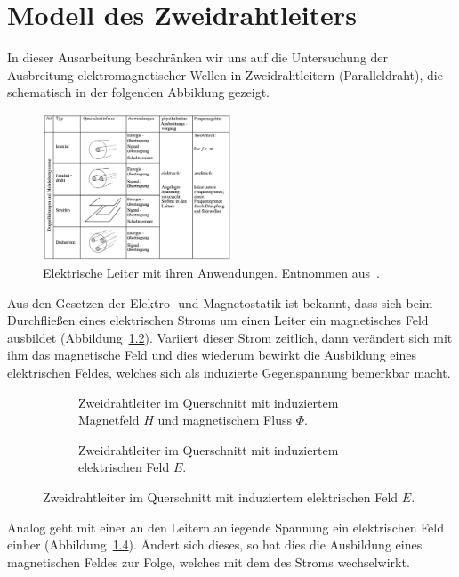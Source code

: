 \documentclass[paper=a4, parskip=half-, ngerman, fontsize=11pt]{scrreprt}
\begin{document}
\chapter{Modell des Zweidrahtleiters}

In dieser Ausarbeitung beschränken wir uns auf die Untersuchung der Ausbreitung elektromagnetischer Wellen in
Zweidrahtleitern (Paralleldraht), die schematisch in der folgenden Abbildung gezeigt.
\begin{figure}[!ht]
    \begin{center}
        \includegraphics[width=0.5\textwidth]{images/Leiter.png}
        \caption{Elektrische Leiter mit ihren Anwendungen. Entnommen aus~\cite{FernuniSkript}.}
        \label{Leiter}
    \end{center}
\end{figure}

Aus den Gesetzen der Elektro- und Magnetostatik ist bekannt, dass sich beim Durchfließen eines elektrischen Stroms um
einen Leiter ein magnetisches Feld ausbildet (Abbildung~\ref{Felder1}). Variiert dieser Strom zeitlich, dann
verändert sich mit ihm das magnetische Feld und dies wiederum bewirkt die Ausbildung eines elektrischen Feldes, welches
sich als induzierte Gegenspannung bemerkbar macht.
\begin{figure}[ht]
    \begin{subfigure}[t]{0.49\textwidth}
        \centering
        
        \caption{Zweidrahtleiter im Querschnitt mit induziertem Magnetfeld $H$ und magnetischem Fluss $\Phi$.}
        \label{Felder1}
    \end{subfigure}%
    \hfill
    \begin{subfigure}[t]{0.49\textwidth}
        \centering
        
        \caption{Zweidrahtleiter im Querschnitt mit induziertem elektrischen Feld $E$.}
        \label{Felder2}
    \end{subfigure}
\end{figure}
Analog geht mit einer an den Leitern anliegende Spannung ein elektrischen Feld einher (Abbildung~\ref{Felder2}).
Ändert sich dieses, so hat dies die Ausbildung eines magnetischen Feldes zur Folge, welches mit dem des Stroms
wechselwirkt.
\end{document}
